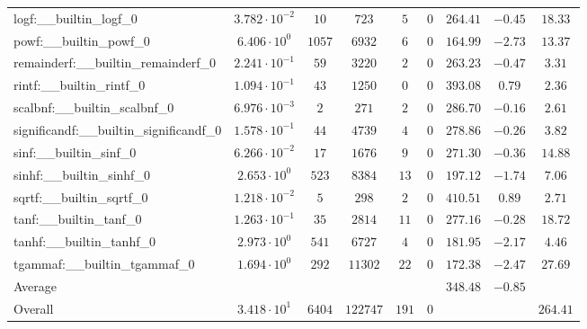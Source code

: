 \begin{tabular}{|l|c|c|c|c|c|c|c|c|}
logf:\_\_builtin\_logf\_0                 & $ 3.782 \cdot 10^{-2} $ & $ 10     $ & $ 723    $ & $ 5   $ & $ 0   $ & $ 264.41      $ & $ -0.45   $ & $ 18.33   $ \\
powf:\_\_builtin\_powf\_0                 & $ 6.406 \cdot 10^{0}  $ & $ 1057   $ & $ 6932   $ & $ 6   $ & $ 0   $ & $ 164.99      $ & $ -2.73   $ & $ 13.37   $ \\
remainderf:\_\_builtin\_remainderf\_0     & $ 2.241 \cdot 10^{-1} $ & $ 59     $ & $ 3220   $ & $ 2   $ & $ 0   $ & $ 263.23      $ & $ -0.47   $ & $ 3.31    $ \\
rintf:\_\_builtin\_rintf\_0               & $ 1.094 \cdot 10^{-1} $ & $ 43     $ & $ 1250   $ & $ 0   $ & $ 0   $ & $ 393.08      $ & $ 0.79    $ & $ 2.36    $ \\
scalbnf:\_\_builtin\_scalbnf\_0           & $ 6.976 \cdot 10^{-3} $ & $ 2      $ & $ 271    $ & $ 2   $ & $ 0   $ & $ 286.70      $ & $ -0.16   $ & $ 2.61    $ \\
significandf:\_\_builtin\_significandf\_0 & $ 1.578 \cdot 10^{-1} $ & $ 44     $ & $ 4739   $ & $ 4   $ & $ 0   $ & $ 278.86      $ & $ -0.26   $ & $ 3.82    $ \\
sinf:\_\_builtin\_sinf\_0                 & $ 6.266 \cdot 10^{-2} $ & $ 17     $ & $ 1676   $ & $ 9   $ & $ 0   $ & $ 271.30      $ & $ -0.36   $ & $ 14.88   $ \\
sinhf:\_\_builtin\_sinhf\_0               & $ 2.653 \cdot 10^{0}  $ & $ 523    $ & $ 8384   $ & $ 13  $ & $ 0   $ & $ 197.12      $ & $ -1.74   $ & $ 7.06    $ \\
sqrtf:\_\_builtin\_sqrtf\_0               & $ 1.218 \cdot 10^{-2} $ & $ 5      $ & $ 298    $ & $ 2   $ & $ 0   $ & $ 410.51      $ & $ 0.89    $ & $ 2.71    $ \\
tanf:\_\_builtin\_tanf\_0                 & $ 1.263 \cdot 10^{-1} $ & $ 35     $ & $ 2814   $ & $ 11  $ & $ 0   $ & $ 277.16      $ & $ -0.28   $ & $ 18.72   $ \\
tanhf:\_\_builtin\_tanhf\_0               & $ 2.973 \cdot 10^{0}  $ & $ 541    $ & $ 6727   $ & $ 4   $ & $ 0   $ & $ 181.95      $ & $ -2.17   $ & $ 4.46    $ \\
tgammaf:\_\_builtin\_tgammaf\_0           & $ 1.694 \cdot 10^{0}  $ & $ 292    $ & $ 11302  $ & $ 22  $ & $ 0   $ & $ 172.38      $ & $ -2.47   $ & $ 27.69   $ \\
\hline
Average                                   & $                     $ & $        $ & $        $ & $     $ & $     $ & $ 348.48      $ & $ -0.85   $ & $         $ \\
\hline
Overall                                   & $ 3.418 \cdot 10^{1}  $ & $ 6404   $ & $ 122747 $ & $ 191 $ & $ 0   $ & $             $ & $         $ & $ 264.41  $ \\
\hline
\end{tabular}
